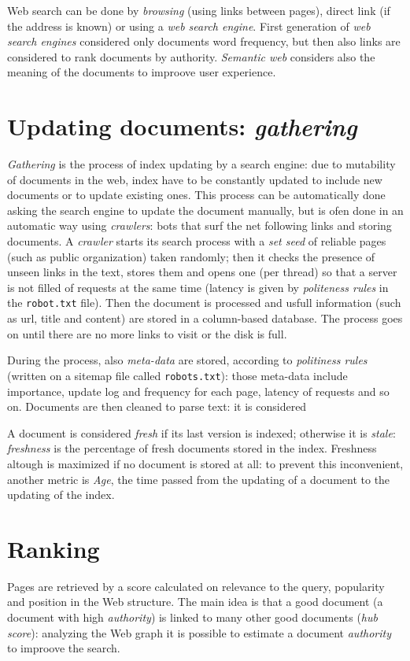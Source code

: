 \documentclass[11pt, a4page]{article}
\begin{document}
Web search can be done by  \textit{browsing} (using links between pages), direct link (if the address is known) or using a \textit{web search engine}.
First generation of \textit{web search engines} considered only documents word frequency, but then also links are considered to rank documents by authority.
\textit{Semantic web} considers also the meaning of the documents to improove user experience.

\section{Updating documents: \textit{gathering}}
\textit{Gathering} is the process of index updating by a search engine: due to mutability of documents in the web, index have to be constantly updated to include new documents or to update existing ones.
This process can be automatically done asking the search engine to update the document manually, but is ofen done in an automatic way using \textit{crawlers}: bots that surf the net following links and storing documents.
A \textit{crawler} starts its search process with a \textit{set seed} of reliable pages (such as public organization) taken randomly; then it checks the presence of unseen links in the text, stores them and opens one (per thread) so that a server is not filled of requests at the same time (latency is given by \textit{politeness rules} in the \verb|robot.txt| file).
Then the document is processed and usfull information (such as url, title and content) are stored in a column-based database.
The process goes on until there are no more links to visit or the disk is full.

During the process, also \textit{meta-data} are stored, according to \textit{politiness rules} (written on a sitemap file called \verb|robots.txt|): those meta-data include importance, update log and frequency for each page, latency of requests and so on.
Documents are then cleaned to parse text: it is considered 

A document is considered \textit{fresh} if its last version is indexed; otherwise it is \textit{stale}: \textit{freshness} is the percentage of fresh documents stored in the index.
Freshness altough is maximized if no document is stored at all: to prevent this inconvenient, another metric is \textit{Age}, the time passed from the updating of a document to the updating of the index.

\section{Ranking}
Pages are retrieved by a score calculated on relevance to the query, popularity and position in the Web structure.
The main idea is that a good document (a document with high \textit{authority}) is linked to many other good documents (\textit{hub score}): analyzing the Web graph it is possible to estimate a document \textit{authority} to improove the search.
\end{document}
